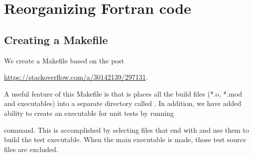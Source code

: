 \section{Reorganizing Fortran code}

\subsection{Creating a Makefile}

We create a Makefile based on the post

\url{https://stackoverflow.com/a/30142139/297131}.

A useful feature of this Makefile is that is places all the build files (*.o, *.mod and executables) into a separate directory called . In addition, we have added ability to create an executable for unit tests by running


command. This is accomplished by selecting files that end with  and use them to build the test executable. When the main executable is made, those test source files are excluded.





